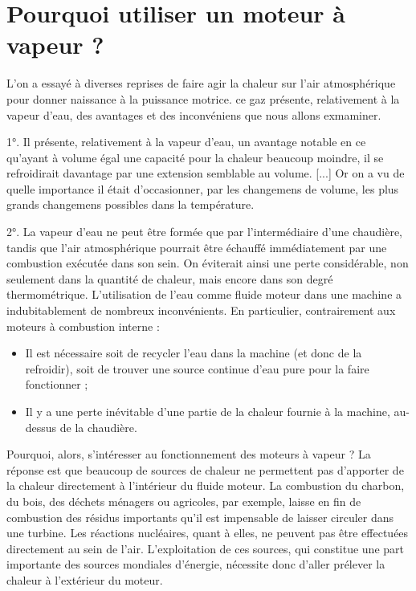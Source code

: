 \section{Pourquoi utiliser un moteur à vapeur ?}

		L’on a essayé à diverses reprises de faire agir la chaleur sur l’air atmosphérique pour donner naissance à la puissance motrice. ce gaz présente, relativement à la vapeur d’eau, des avantages et des inconvéniens que nous allons exmaminer.
		
	1°. Il présente, relativement à la vapeur d’eau, un avantage notable en ce qu’ayant à volume égal une capacité pour la chaleur beaucoup moindre, il se refroidirait davantage par une extension semblable au volume. [...] Or on a vu de quelle importance il était d’occasionner, par les changemens de volume, les plus grands changemens possibles dans la température.
	
	2°. La vapeur d’eau ne peut être formée que par l’intermédiaire d’une chaudière, tandis que l’air atmosphérique pourrait être échauffé immédiatement par une combustion exécutée dans son sein. On éviterait ainsi une perte considérable, non seulement dans la quantité de chaleur, mais encore dans son degré thermométrique.
	L’utilisation de l’eau comme fluide moteur dans une machine a indubitablement de nombreux inconvénients. En particulier, contrairement aux moteurs à combustion interne :
	\begin{itemize}
		\item Il est nécessaire soit de recycler l’eau dans la machine (et donc de la refroidir), soit de trouver une source continue d’eau pure pour la faire fonctionner ;
		\item Il y a une perte inévitable d’une partie de la chaleur fournie à la machine, au-dessus de la chaudière.
	\end{itemize}

	Pourquoi, alors, s’intéresser au fonctionnement des moteurs à vapeur ? La réponse est que beaucoup de sources de chaleur ne permettent pas d’apporter de la chaleur directement à l’intérieur du fluide moteur. La combustion du charbon, du bois, des déchets ménagers ou agricoles, par exemple, laisse en fin de combustion des résidus importants qu’il est impensable de laisser circuler dans une turbine. Les réactions nucléaires, quant à elles, ne peuvent pas être effectuées directement au sein de l’air. L’exploitation de ces sources, qui constitue une part importante des sources mondiales d’énergie, nécessite donc d’aller prélever la chaleur à l’extérieur du moteur.

